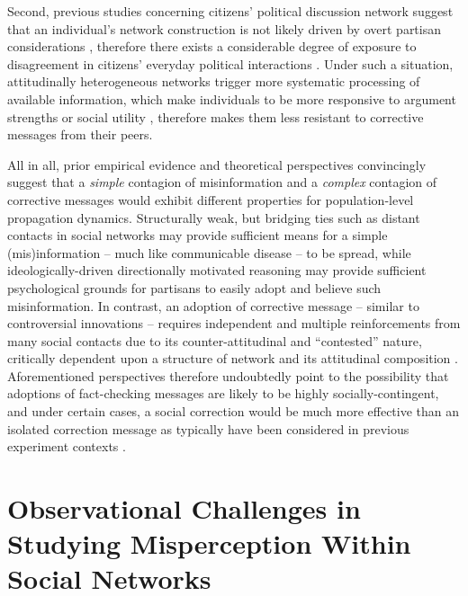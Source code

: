\documentclass[man, 12pt, a4paper, noextraspace]{apa6}
\begin{document}
    Second, previous studies concerning citizens' political discussion network suggest that an individual's network construction is not likely driven by overt partisan considerations \parencite{song2015uncovering,lazer2010coevolution}, therefore there exists a considerable degree of exposure to disagreement in citizens' everyday political interactions \parencite[e.g.,][]{Bakshy1130, morey2012matters}. Under such a situation, attitudinally heterogeneous networks trigger more systematic processing of available information, which make individuals to be more responsive to argument strengths \parencite{levitan2008resistance} or social utility \parencite{messing2014selective}, therefore makes them less resistant to corrective messages from their peers.    

  All in all, prior empirical evidence and theoretical perspectives convincingly suggest that a \emph{simple} contagion of misinformation and a \emph{complex} contagion of corrective messages would exhibit different properties for population-level propagation dynamics. Structurally weak, but bridging ties such as distant contacts in social networks may provide sufficient means for a simple (mis)information -- much like communicable disease -- to be spread, while ideologically-driven directionally motivated reasoning may provide sufficient psychological grounds for partisans to easily adopt and believe such misinformation. In contrast, an adoption of corrective message -- similar to controversial innovations -- requires independent and multiple reinforcements from many social contacts due to its counter-attitudinal and \enquote{contested} nature, critically dependent upon a structure of network and its attitudinal composition \parencite{centola2007complex, Centola2010Sience, gonzalez2017decoding}. Aforementioned perspectives therefore undoubtedly point to the possibility that adoptions of fact-checking messages are likely to be highly socially-contingent, and under certain cases, a social correction would be much more effective than an isolated correction message as typically have been considered in previous experiment contexts \parencite[e.g.,][]{nyhan2010corrections,garrett2013undermining}.
    

\section{Observational Challenges in Studying Misperception Within Social Networks}
\end{document}
